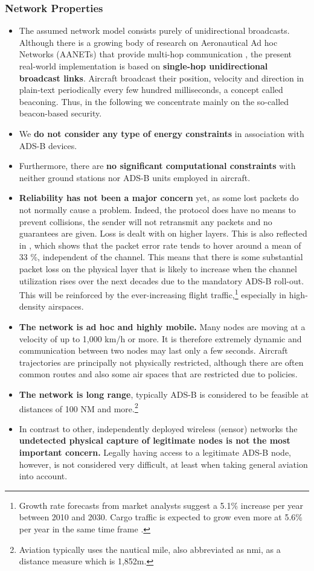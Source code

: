 \documentclass[english]{IEEEtran}
\begin{document}
\subsubsection*{Network Properties}
\begin{itemize}
\item The assumed network model consists purely of unidirectional broadcasts.
Although there is a growing body of research on Aeronautical Ad hoc
Networks (AANETs) that provide multi-hop communication \cite{Li2010},
the present real-world implementation is based on \textbf{single-hop
unidirectional broadcast links}. Aircraft broadcast their position,
velocity and direction in plain-text periodically\emph{ }every few
hundred milliseconds, a concept called beaconing. Thus, in the following
we concentrate mainly on the so-called beacon-based security.
\item We \textbf{do not consider any type of energy constraints} in association
with ADS-B devices. 
\item Furthermore, there are \textbf{no significant computational constraints}
with neither ground stations nor ADS-B units employed in aircraft.
\item \textbf{Reliability has not been a major concern} yet, as some lost
packets do not normally cause a problem. Indeed, the protocol does
have no means to prevent collisions, the sender will not retransmit
any packets and no guarantees are given. Loss is dealt with on higher
layers. This is also reflected in \cite{schafer2013experimental},
which shows that the packet error rate tends to hover around a mean
of 33 \%, independent of the channel. This means that there is some
substantial packet loss on the physical layer that is likely to increase
when the channel utilization rises over the next decades due to the
mandatory ADS-B roll-out. This will be reinforced by the ever-increasing
flight traffic,\footnote{Growth rate forecasts from market analysts suggest a 5.1\% increase
per year between 2010 and 2030. Cargo traffic is expected to grow
even more at 5.6\% per year in the same time frame \cite{Boeing}. } especially in high-density airspaces.
\item \textbf{The network is ad hoc and highly mobile.} Many nodes are moving
at a velocity of up to 1,000 km/h or more. It is therefore extremely
dynamic and communication between two nodes may last only a few seconds.
Aircraft trajectories are principally not physically restricted, although
there are often common routes and also some air spaces that are restricted
due to policies.
\item \textbf{The network is long range}, typically ADS-B is considered
to be feasible at distances of 100 NM and more.\footnote{Aviation typically uses the nautical mile, also abbreviated as nmi,
as a distance measure which is 1,852m.}
\item In contrast to other, independently deployed wireless (sensor) networks
the \textbf{undetected physical capture of legitimate nodes is not
the most important concern.} Legally having access to a legitimate
ADS-B node, however, is not considered very difficult, at least when
taking general aviation into account.\\


\end{itemize}
\end{document}
